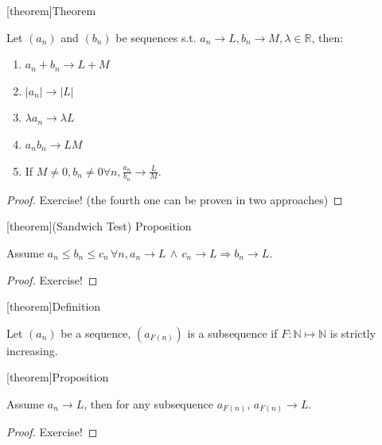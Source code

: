 \documentclass[12pt]{report}
\theoremstyle{definition}
\begin{document}
[theorem]{Theorem}
\begin{algebra of limits of sequences}
    Let $(a_n)$ and $(b_n)$ be sequences s.t. $a_n \rightarrow{}L, b_n \rightarrow{}M, \lambda\in\mathbb{R}$, then:
    \begin{enumerate}[label = (\arabic*)]
        \item $a_n + b_n \rightarrow{}L + M$
        \item $|a_n| \rightarrow{}|L|$
        \item $\lambda a_n \rightarrow{}\lambda L$
        \item $a_n b_n \rightarrow{} LM$
        \item If $M \neq 0, b_n \neq 0 \forall n, \frac{a_n}{b_n} \rightarrow{}\frac{L}{M}$.
    \end{enumerate}
    
\end{algebra of limits of sequences}

\begin{proof}
    Exercise! (the fourth one can be proven in two approaches)
\end{proof}

[theorem]{(Sandwich Test) Proposition}
\begin{sandwich theorem}
    Assume $a_n \le b_n \le c_n \,\forall n, 
    a_n \rightarrow{}L \,\wedge\, c_n \rightarrow{}L \Rightarrow{}b_n \rightarrow{}L$.
\end{sandwich theorem}

\begin{proof}
    Exercise!
\end{proof}

[theorem]{Definition}
\begin{subsequences}
    Let $(a_n)$ be a sequence, $(a_{F(n)})$ is a subsequence if $F: \mathbb{N} \mapsto{} \mathbb{N}$
    is strictly increasing.
\end{subsequences}

[theorem]{Proposition}
\begin{subsequence limit}
    Assume $a_n \rightarrow{} L$, then for any subsequence $a_{F(n)}$,
    $a_{F(n)} \rightarrow{} L$.
\end{subsequence limit}

\begin{proof}
    Exercise!
\end{proof}
\end{document}
